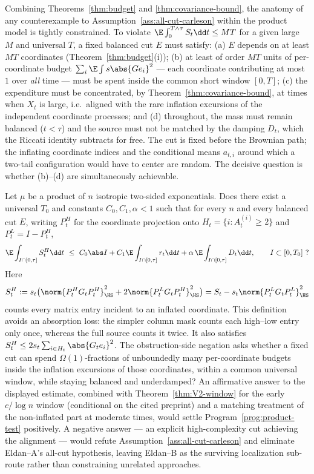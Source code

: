 \documentclass[../../main.tex]{subfiles}
\begin{document}
Combining Theorems~\ref{thm:budget} and \ref{thm:covariance-bound}, the anatomy of any
counterexample to Assumption~\ref{ass:all-cut-carleson} within the product model is tightly constrained. To violate
$\E\int_0^{T\wedge\tau}S_t\dd t\le MT$ for a given large $M$ and universal $T$, a fixed
balanced cut $E$ must satisfy: (a) $E$ depends on at least $MT$ coordinates
(Theorem~\ref{thm:budget}(i)); (b) at least of order $MT$ units of per-coordinate budget
$\sum_i\E\int s\abs{Ge_i}^2$ --- each coordinate contributing at most $1$ over \emph{all}
time --- must be spent inside the common short window $[0,T]$; (c) the expenditure must be
concentrated, by Theorem~\ref{thm:covariance-bound}, at times when $X_t$ is large, i.e.\
aligned with the rare inflation excursions of the independent coordinate processes; and
(d) throughout, the mass must remain balanced ($t<\tau$) and the source must not be matched
by the damping $D_t$, which the Riccati identity subtracts for free. The cut is fixed before
the Brownian path; the inflating coordinate indices and the conditional means $a_{t,i}$
around which a two-tail configuration would have to center are random. The decisive question
is whether (b)--(d) are simultaneously achievable.

\begin{question}
\label{q:alignment}
Let $\mu$ be a product of $n$ isotropic two-sided exponentials. Does there exist a universal
$T_0$ and constants $C_0,C_1,\alpha<1$ such that for every $n$ and every balanced cut $E$,
writing $P_t^H$ for the coordinate projection onto
$H_t=\{i:A_t^{(i)}\ge2\}$ and $P_t^L=I-P_t^H$,
\[
  \E\int_{I\cap[0,\tau]} S_t^H\dd t
  \ \le\ C_0\abs I+C_1\E\int_{I\cap[0,\tau]}r_t\dd t
  +\alpha\,\E\int_{I\cap[0,\tau]}D_t\dd t ,
  \qquad I\subset[0,T_0]\ ?
\]
Here
\[
 S_t^H:=s_t\bigl(\norm{P_t^HG_tP_t^H}_\HS^2
       +2\norm{P_t^LG_tP_t^H}_\HS^2\bigr)
 =S_t-s_t\norm{P_t^LG_tP_t^L}_\HS^2
\]
counts every matrix entry incident to an inflated coordinate. This definition avoids an
absorption loss: the simpler column mask counts each high--low entry only once, whereas the full
source counts it twice. It also satisfies
$S_t^H\le2s_t\sum_{i\in H_t}\abs{G_te_i}^2$.
The obstruction-side negation asks whether a fixed cut can spend
$\Omega(1)$-fractions of unboundedly many per-coordinate budgets inside the inflation
excursions of those coordinates, within a common universal window, while staying balanced and
underdamped? An affirmative answer to the displayed estimate, combined with
Theorem~\textup{\ref{thm:V2-window}} for the early $c/\log n$ window (conditional on the cited
preprint) and a matching treatment of the
non-inflated part at moderate times, would settle Program~\ref{prog:product-test} positively. A negative answer
--- an explicit high-complexity cut achieving the alignment --- would refute Assumption~\ref{ass:all-cut-carleson}
and eliminate Eldan--A's all-cut hypothesis, leaving Eldan--B as the surviving localization
sub-route rather than constraining unrelated approaches.
\end{question}
\end{document}
